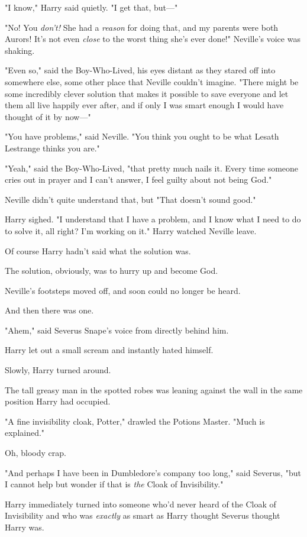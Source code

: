 "I know," Harry said quietly. "I get that, but\mbox{---}"

"No! You \emph{don't!} She had a \emph{reason} for doing that, and my parents
were both Aurors! It's not even \emph{close} to the worst thing she's ever
done!" Neville's voice was shaking.

"Even so," said the Boy-Who-Lived, his eyes distant as they stared off into
somewhere else, some other place that Neville couldn't imagine. "There might be
some incredibly clever solution that makes it possible to save everyone and let
them all live happily ever after, and if only I was smart enough I would have
thought of it by now\mbox{---}"

"You have problems," said Neville. "You think you ought to be what Lesath
Lestrange thinks you are."

"Yeah," said the Boy-Who-Lived, "that pretty much nails it. Every time someone
cries out in prayer and I can't answer, I feel guilty about not being God."

Neville didn't quite understand that, but{\el} "That doesn't sound good."

Harry sighed. "I understand that I have a problem, and I know what I need to do
to solve it, all right? I'm working on it."
\sbreak
Harry watched Neville leave.

Of course Harry hadn't said what the solution was.

The solution, obviously, was to hurry up and become God.

Neville's footsteps moved off, and soon could no longer be heard.

And then there was one.

"Ahem," said Severus Snape's voice from directly behind him.

Harry let out a small scream and instantly hated himself.

Slowly, Harry turned around.

The tall greasy man in the spotted robes was leaning against the wall in the
same position Harry had occupied.

"A fine invisibility cloak, Potter," drawled the Potions Master. "Much is
explained."

Oh, bloody crap.

"And perhaps I have been in Dumbledore's company too long," said Severus, "but
I cannot help but wonder if that is \emph{the} Cloak of Invisibility."

Harry immediately turned into someone who'd never heard of the Cloak of
Invisibility and who was \emph{exactly} as smart as Harry thought Severus
thought Harry was.

